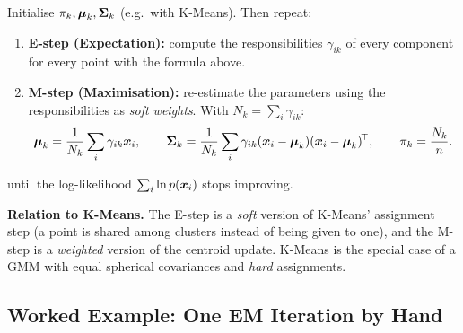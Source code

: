 \begin{definition}
Initialise $\pi_k,\boldsymbol{\mu}_k,\boldsymbol{\Sigma}_k$ (e.g.\ with K-Means). Then repeat:
\begin{enumerate}
  \item \textbf{E-step (Expectation):} compute the responsibilities $\gamma_{ik}$ of every component for every point with the formula above.
  \item \textbf{M-step (Maximisation):} re-estimate the parameters using the responsibilities as \emph{soft weights}. With $N_k=\sum_i\gamma_{ik}$:
  \[
    \boldsymbol{\mu}_k=\frac{1}{N_k}\sum_i\gamma_{ik}\boldsymbol{x}_i,\qquad
    \boldsymbol{\Sigma}_k=\frac{1}{N_k}\sum_i\gamma_{ik}(\boldsymbol{x}_i-\boldsymbol{\mu}_k)(\boldsymbol{x}_i-\boldsymbol{\mu}_k)^{\!\top},\qquad
    \pi_k=\frac{N_k}{n}.
  \]
\end{enumerate}
until the log-likelihood $\sum_i\ln p(\boldsymbol{x}_i)$ stops improving.
\end{definition}

\textbf{Relation to K-Means.} The E-step is a \emph{soft} version of K-Means' assignment step (a point is shared among clusters instead of being given to one), and the M-step is a \emph{weighted} version of the centroid update. K-Means is the special case of a GMM with equal spherical covariances and \emph{hard} assignments.

\subsection{Worked Example: One EM Iteration by Hand}


